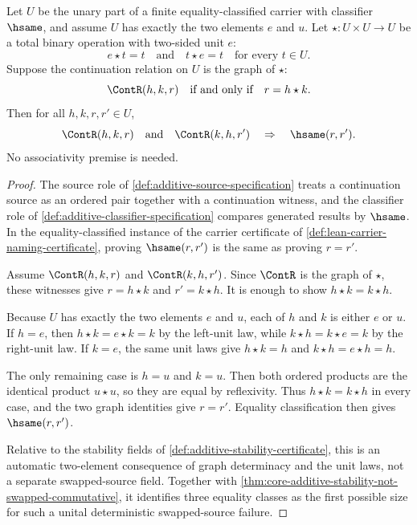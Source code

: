 \begin{theorem}
\label{thm:two-element-unital-continuation-commutativity}
Let $U$ be the unary part of a finite equality-classified carrier with classifier $\hsame$, and assume $U$ has exactly the two elements $e$ and $u$. Let $\star:U\times U\to U$ be a total binary operation with two-sided unit $e$:
$$
  e\star t=t
  \quad\text{and}\quad
  t\star e=t
  \quad\text{for every }t\in U.
$$
Suppose the continuation relation on $U$ is the graph of $\star$:
$$
  \ContR(h,k,r)
  \quad\text{if and only if}\quad
  r=h\star k.
$$
Then for all $h,k,r,r'\in U$,
$$
  \ContR(h,k,r)
  \quad\text{and}\quad
  \ContR(k,h,r')
  \quad\Rightarrow\quad
  \hsame(r,r').
$$
No associativity premise is needed.
\end{theorem}
\begin{proof}
The source role of \autoref{def:additive-source-specification} treats a continuation source as an ordered pair together with a continuation witness, and the classifier role of \autoref{def:additive-classifier-specification} compares generated results by $\hsame$. In the equality-classified instance of the carrier certificate of \autoref{def:lean-carrier-naming-certificate}, proving $\hsame(r,r')$ is the same as proving $r=r'$.

Assume $\ContR(h,k,r)$ and $\ContR(k,h,r')$. Since $\ContR$ is the graph of $\star$, these witnesses give $r=h\star k$ and $r'=k\star h$. It is enough to show $h\star k=k\star h$.

Because $U$ has exactly the two elements $e$ and $u$, each of $h$ and $k$ is either $e$ or $u$. If $h=e$, then $h\star k=e\star k=k$ by the left-unit law, while $k\star h=k\star e=k$ by the right-unit law. If $k=e$, the same unit laws give $h\star k=h$ and $k\star h=e\star h=h$.

The only remaining case is $h=u$ and $k=u$. Then both ordered products are the identical product $u\star u$, so they are equal by reflexivity. Thus $h\star k=k\star h$ in every case, and the two graph identities give $r=r'$. Equality classification then gives $\hsame(r,r')$.

Relative to the stability fields of \autoref{def:additive-stability-certificate}, this is an automatic two-element consequence of graph determinacy and the unit laws, not a separate swapped-source field. Together with \autoref{thm:core-additive-stability-not-swapped-commutative}, it identifies three equality classes as the first possible size for such a unital deterministic swapped-source failure.
\end{proof}

